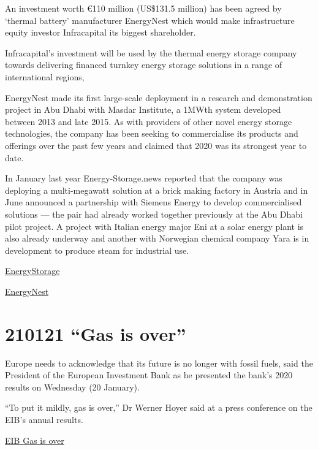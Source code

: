 \documentclass[
]{book}
\begin{document}
An investment worth €110 million (US\$131.5 million) has been agreed by `thermal battery' manufacturer EnergyNest which would make infrastructure equity investor Infracapital its biggest shareholder.

Infracapital's investment will be used by the thermal energy storage company towards delivering financed turnkey energy storage solutions in a range of international regions,

EnergyNest made its first large-scale deployment in a research and demonstration project in Abu Dhabi with Masdar Institute, a 1MWth system developed between 2013 and late 2015. As with providers of other novel energy storage technologies, the company has been seeking to commercialise its products and offerings over the past few years and claimed that 2020 was its strongest year to date.

In January last year Energy-Storage.news reported that the company was deploying a multi-megawatt solution at a brick making factory in Austria and in June announced a partnership with Siemens Energy to develop commercialised solutions --- the pair had already worked together previously at the Abu Dhabi pilot project. A project with Italian energy major Eni at a solar energy plant is also already underway and another with Norwegian chemical company Yara is in development to produce steam for industrial use.

\href{https://www.energy-storage.news/news/thermal-energy-storage-startup-energynest-secures-us130-million-investment}{EnergyStorage}

\href{https://energy-nest.com/technology/}{EnergyNest}

\hypertarget{gas-is-over}{%
\section{210121 ``Gas is over''}\label{gas-is-over}}

Europe needs to acknowledge that its future is no longer with fossil fuels, said the President of the European Investment Bank as he presented the bank's 2020 results on Wednesday (20 January).

``To put it mildly, gas is over,'' Dr Werner Hoyer said at a press conference on the EIB's annual results.

\href{https://www.euractiv.com/section/energy-environment/news/gas-is-over-eu-bank-chief-says/}{EIB Gas is over}

  
\end{document}
